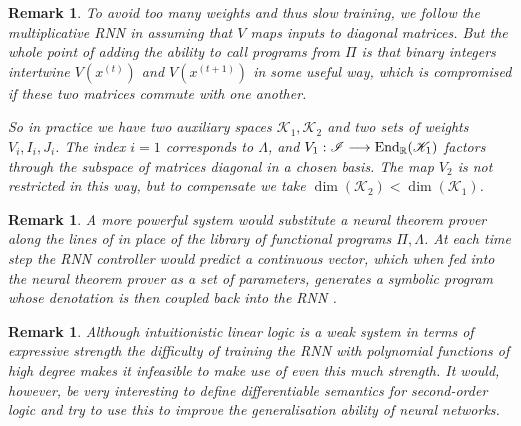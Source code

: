 \documentclass[english,letter paper,12pt,leqno]{article}
\theoremstyle{example}
\newtheorem{remark}[theorem]{Remark}
\numberwithin{equation}{section}
\DeclareMathOperator{\End}{End}
\begin{document}
\begin{remark} To avoid too many weights and thus slow training, we follow the multiplicative RNN in assuming that $V$ maps inputs to diagonal matrices. But the whole point of adding the ability to call programs from $\Pi$ is that binary integers intertwine $V(x^{(t)})$ and $V(x^{(t+1)})$ in some useful way, which is compromised if these two matrices commute with one another.

So in practice we have two auxiliary spaces $\mathscr{K}_1,\mathscr{K}_2$ and two sets of weights $V_i,I_i,J_i$. The index $i = 1$ corresponds to $\Lambda$, and $V_1: \mathscr{I} \lto \End_{\mathbb{R}}(\mathscr{K}_1)$ factors through the subspace of matrices diagonal in a chosen basis. The map $V_2$ is not restricted in this way, but to compensate we take $\dim(\mathscr{K}_2) < \dim(\mathscr{K}_1)$.
\end{remark}


\begin{remark} A more powerful system would substitute a neural theorem prover along the lines of \cite{alemi,ntp} in place of the library of functional programs $\Pi, \Lambda$. At each time step the RNN controller would predict a continuous vector, which when fed into the neural theorem prover as a set of parameters, generates a symbolic program whose denotation is then coupled back into the RNN \cite{tarlow}.
\end{remark}

\begin{remark} Although intuitionistic linear logic is a weak system in terms of expressive strength the difficulty of training the RNN with polynomial functions of high degree makes it infeasible to make use of even this much strength. It would, however, be very interesting to define differentiable semantics for second-order logic and try to use this to improve the generalisation ability of neural networks.
\end{remark}
\end{document}
